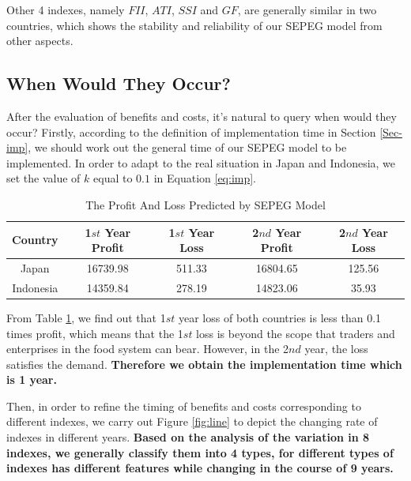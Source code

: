 \documentclass{mcmthesis}
\begin{document}
Other 4 indexes, namely $FII$, $ATI$, $SSI$ and $GF$, are generally similar in two countries, which shows the stability and reliability of our SEPEG model from other aspects.
 
 
\subsection{When Would They Occur?}
\label{Sec-when}

After the evaluation of benefits and costs, it's natural to query when would they occur? Firstly, according to the definition of implementation time in Section \ref{Sec-imp}, we should work out the general time of our SEPEG model to be implemented. In order to adapt to the real situation in Japan and Indonesia, we set the value of $k$ equal to $0.1$ in Equation \eqref{eq:imp}.

 \begin{table}[h]
 	\centering
 	\caption{The Profit And Loss Predicted by SEPEG Model}
 	\label{tab:imp}
 	\begin{tabular}{c c c c c}
 		\hline
 	Country	&1$st$ Year Profit &  1$st$ Year Loss &2$nd$ Year Profit &2$nd$ Year Loss\\
 		\hline
 		Japan &16739.98 &511.33 & 16804.65&125.56\\
 		Indonesia& 14359.84& 278.19&14823.06&35.93\\
 		\hline
 	\end{tabular}
 \end{table}

From Table \ref{tab:imp}, we find out that 1$st$ year loss of both countries is less than 0.1 times profit, which means that the 1$st$ loss is beyond the scope that traders and enterprises in the food system can bear. However, in the 2$nd$ year, the loss satisfies the demand. \textbf{Therefore we obtain the implementation time which is 1 year.}

Then, in order to refine the timing of benefits and costs corresponding to different indexes, we carry out Figure \ref{fig:line} to depict the changing rate of indexes in different years. \textbf{Based on the analysis of the variation in 8 indexes, we generally classify them into 4 types, for different types of indexes has different features while changing in the course of 9 years.}
\end{document}
